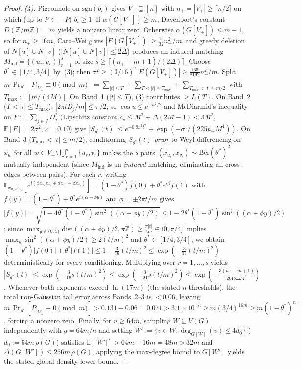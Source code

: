 \documentclass[11pt,a4paper]{article}
\theoremstyle{definition}
\newcommand{\Z}{\mathbb{Z}}
\begin{document}
\begin{proof}
\emph{(4).} Pigeonhole on $\mathrm{sgn}(b_i)$ gives $V_+ \subseteq [n]$ with $n_+ = |V_+| \ge \lceil n/2 \rceil$ on which (up to $P \leftarrow -P$) $b_i \ge 1$. If $\alpha(G[V_+]) \ge m$, Davenport's constant $D(\Z/m\Z) = m$ yields a nonzero linear zero. Otherwise $\alpha(G[V_+]) \le m - 1$, so for $n_+ \ge 16m$, Caro--Wei gives $|E(G[V_+])| \ge \frac{15}{32} n_+^2 / m$, and greedy deletion of $N[u] \cup N[v]$ ($|N[u] \cup N[v]| \le 2\Delta$) produces an induced matching $M_{\mathrm{ind}} = \{(u_r, v_r)\}_{r=1}^s$ of size $s \ge \lceil (n_+ - m + 1)/(2\Delta) \rceil$. Choose $\theta^* \in [1/4, 3/4]$ by~(3); then $\sigma^2 \ge (3/16)^2 |E(G[V_+])| \ge \frac{135}{8192} n_+^2 / m$. Split $m\,\Pr_{\theta^*}[P|_{V_+} \equiv 0 \pmod m] = \sum_{|t| \le T} + \sum_{T < |t| \le T_{\max}} + \sum_{T_{\max} < |t| \le m/2}$ with $T_{\max} := \lfloor m / (4M) \rfloor$. On Band~1 ($|t| \le T$), (3) contributes $\ge L(T)$. On Band~2 ($T < |t| \le T_{\max}$), $|2\pi t D_j / m| \le \pi/2$, so $\cos u \le e^{-u^2/2}$ and McDiarmid's inequality on $F := \sum_{j \in J} D_j^2$ (Lipschitz constant $c_v \le M^2 + \Delta(2M-1) < 3M^2$, $\mathbb{E}[F] = 2\sigma^2$, $\varepsilon = 0.10$) give $|S_{\theta^*}(t)| \le e^{-0.9 x^2 t^2} + \exp(-\sigma^4 / (225 n_+ M^4))$. On Band~3 ($T_{\max} < |t| \le m/2$), conditioning $S_{\theta^*}(t)$ \emph{prior} to Weyl differencing on $x_w$ for all $w \in V_+ \setminus \bigcup_{r=1}^s \{u_r, v_r\}$ makes the $s$ pairs $(x_{u_r}, x_{v_r}) \sim \mathrm{Ber}(\theta^*)^2$ mutually independent (since $M_{\mathrm{ind}}$ is an \emph{induced} matching, eliminating all cross-edges between pairs). For each $r$, writing $\mathbb{E}_{x_{u_r}, x_{v_r}}[e^{i(\phi x_{u_r} x_{v_r} + \alpha x_{u_r} + \beta x_{v_r})}] = (1-\theta^*) f(0) + \theta^* e^{i\beta} f(1)$ with $f(y) = (1-\theta^*) + \theta^* e^{i(\alpha + \phi y)}$ and $\phi = \pm 2\pi t / m$ gives $|f(y)| = \sqrt{1 - 4\theta^*(1-\theta^*)\sin^2((\alpha+\phi y)/2)} \le 1 - 2\theta^*(1-\theta^*)\sin^2((\alpha+\phi y)/2)$; since $\max_{y\in\{0,1\}} \mathrm{dist}((\alpha+\phi y)/2, \pi\Z) \ge \frac{\pi|t|}{2m} \in (0, \pi/4]$ implies $\max_y \sin^2((\alpha+\phi y)/2) \ge 2(t/m)^2$ and $\theta^* \in [1/4, 3/4]$, we obtain $(1-\theta^*)|f(0)| + \theta^*|f(1)| \le 1 - \frac{3}{16}(t/m)^2 \le \exp(-\frac{3}{16}(t/m)^2)$ deterministically for every conditioning. Multiplying over $r = 1,\dots,s$ yields $|S_{\theta^*}(t)| \le \exp(-\frac{3}{16} s (t/m)^2) \le \exp(-\frac{3}{64} s (t/m)^2) \le \exp(-\frac{3(n_+ - m + 1)}{2048 \Delta M^2})$. Whenever both exponents exceed $\ln(17m)$ (the stated $n$-thresholds), the total non-Gaussian tail error across Bands~2--3 is $< 0.06$, leaving $m\,\Pr_{\theta^*}[P|_{V_+} \equiv 0 \pmod m] > 0.131 - 0.06 = 0.071 > 3.1 \times 10^{-6} \ge m (3/4)^{16m} \ge m(1 - \theta^*)^{n_+}$, forcing a nonzero zero. Finally, for $n \ge 64m$, sampling $W \subseteq V(G)$ independently with $q = 64m / n$ and setting $W' := \{v \in W : \deg_{G[W]}(v) \le 4 d_0\}$ ($d_0 := 64m\,\rho(G)$) satisfies $\mathbb{E}[|W'|] > 64m - 16m = 48m > 32m$ and $\Delta(G[W']) \le 256m\,\rho(G)$; applying the max-degree bound to $G[W']$ yields the stated global density lower bound.
\end{proof}
\end{document}
